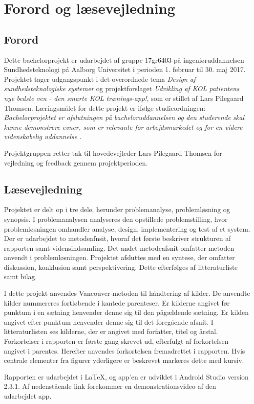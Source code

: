 \chapter*{Forord og læsevejledning}

\section*{Forord}
Dette bachelorprojekt er udarbejdet af gruppe 17gr6403 på ingeniøruddannelsen Sundhedsteknologi på Aalborg Universitet i perioden 1. februar til 30. maj 2017. Projektet tager udgangspunkt i det overordnede tema \textit{Design af sundhedsteknologiske systemer} og projektforslaget \textit{Udvikling af KOL patientens nye bedste ven - den smarte KOL trænings-app!}, som er stillet af Lars Pilegaard Thomsen. 
Læringsmålet for dette projekt er ifølge studieordningen: \textit{Bachelorprojektet er afslutningen på bacheloruddannelsen og den studerende skal kunne demonstrere evner, som er relevante for arbejdsmarkedet og for en videre videnskabelig uddannelse} \cite{Studieordning2014}.

Projektgruppen retter tak til hovedevejleder Lars Pilegaard Thomsen for vejledning og feedback gennem projektperioden.

\section*{Læsevejledning}
Projektet er delt op i tre dele, herunder problemanalyse, problemløsning og synopsis. I problemanalysen analyseres den opstillede problemstilling, hvor problemløsningen omhandler analyse, design, implementering og test af et system. Der er udarbejdet to metodeafnsit, hvoraf det første beskriver strukturen af rapporten samt vidensindsamling. Det andet metodeafsnit omfatter metoden anvendt i problemløsningen. Projektet afsluttes med en syntese, der omfatter diskussion, konklusion samt perspektivering. Dette efterfølges af litteraturliste samt bilag. 

I dette projekt anvendes Vancouver-metoden til håndtering af kilder. De anvendte kilder nummereres fortløbende i kantede parenteser. Er kilderne angivet før punktum i en sætning henvender denne sig til den pågældende sætning. Er kilden angivet efter punktum henvender denne sig til det foregående afsnit. I litteraturlisten ses kilderne, der er angivet med forfatter, titel og årstal. Forkortelser i rapporten er første gang skrevet ud, efterfulgt af forkortelsen angivet i parentes. Herefter anvendes forkortelsen fremadrettet i rapporten. Hvis centrale elementer fra figurer yderligere er beskrevet markeres dette med kursiv. 

Rapporten er udarbejdet i \LaTeX, og app'en er udviklet i Android Studio version 2.3.1.
Af nedenstående link forekommer en demonstrationsvideo af den udarbejdet app. 